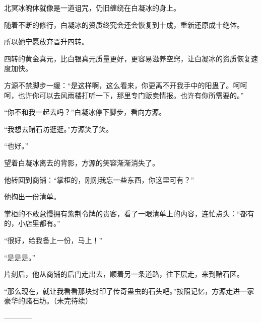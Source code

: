 \begin{this_body}
北冥冰魄体就像是一道诅咒，仍旧缠绕在白凝冰的身上。

随着不断的修行，白凝冰的资质终究会还会恢复到十成，重新还原成十绝体。

所以她宁愿放弃晋升四转。

四转的黄金真元，比白银真元质量更好，更容易滋养空窍，让白凝冰的资质恢复速度加快。

方源不禁脚步一缓：“是这样啊，这么看来，你更离不开我手中的阳蛊了。呵呵呵，也许你可以去风雨楼打听一下，那里专门贩卖情报。也许有你所需要的。”

“你不和我一起去吗？”白凝冰停下脚步，看向方源。

“我想去赌石坊逛逛。”方源笑了笑。

“也好。”

望着白凝冰离去的背影，方源的笑容渐渐消失了。

他转回到商铺：“掌柜的，刚刚我忘一些东西，你这里可有？”

他掏出一份清单。

掌柜的不敢怠慢拥有紫荆令牌的贵客，看了一眼清单上的内容，连忙点头：“都有的，小店里都有。”

“很好，给我备上一份，马上！”

“是是是。”

片刻后，他从商铺的后门走出去，顺着另一条道路，往下层走，来到赌石区。

“那么现在，就让我看看那块封印了传奇蛊虫的石头吧。”按照记忆，方源走进一家豪华的赌石坊。（未完待续）

------------

\end{this_body}

